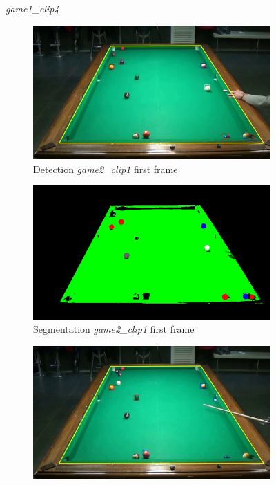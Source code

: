 \begin{figure}[H]
	\caption{\textit{game1\_clip4}}
\end{figure}


\begin{figure}[H]
	\centering
	\begin{subfigure}[b]{0.48\textwidth}
		\centering
		\includegraphics[width=\textwidth]{images/Detection/game2_clip1_detected_balls_first_frame.jpg}
		\caption{Detection \textit{game2\_clip1} first frame}
		\label{fig: game2_clip1_first_frame_detected}
	\end{subfigure}
	\begin{subfigure}[b]{0.48\textwidth}
		\centering
		\includegraphics[width=\textwidth]{images/Segmentation/game2_clip1_segmented_balls_first_frame.jpg}
		\caption{Segmentation \textit{game2\_clip1} first frame}
		\label{fig: game2_clip1_first_frame_segmented}
	\end{subfigure}
	\centering
	\begin{subfigure}[b]{0.48\textwidth}
		\centering
		\includegraphics[width=\textwidth]{images/Detection/game2_clip1_detected_balls_last_frame.jpg}

\end{subfigure}
\end{figure}
